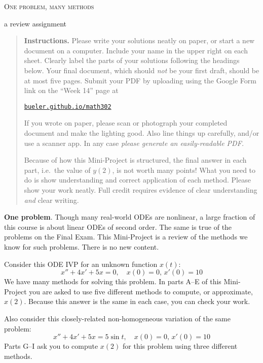 \documentclass[12pt]{article}
\theoremstyle{definition}
\begin{document}
\renewcommand{\d}{\displaystyle}

\strut
\centerline{{\Large \textsc{One problem, many methods}}}

\medskip
\centerline{{\large a review assignment}}

\medskip
\small
\renewcommand{\baselinestretch}{1.0}
\begin{quote}
\textbf{Instructions.}  Please write your solutions neatly on paper, or start a new document on a computer.  Include your name in the upper right on each sheet.  Clearly label the parts of your solutions following the headings below.    Your final document, which should \emph{not} be your first draft, should be at most five pages.  Submit your PDF by uploading using the Google Form link on the ``Week 14'' page at

     \centerline{\href{https://bueler.github.io/math302/index.html}{\texttt{bueler.github.io/math302}}}  

If you wrote on paper, please scan or photograph your completed document and make the lighting good.  Also line things up carefully, and/or use a scanner app.  In any case \emph{please generate an easily-readable PDF.}

Because of how this Mini-Project is structured, the final answer in each part, i.e.~the value of $y(2)$, is not worth many points!  What you need to do is show understanding and correct application of each method.  Please show your work neatly.  Full credit requires evidence of clear understanding \emph{and} clear writing.
\end{quote}

\normalsize
\bigskip
\renewcommand{\baselinestretch}{1.1}

\textbf{One problem}.  Though many real-world ODEs are nonlinear, a large fraction of this course is about linear ODEs of second order.  The same is true of the problems on the Final Exam.  This Mini-Project is a review of the methods we know for such problems.  There is no new content.

Consider this ODE IVP for an unknown function $x(t)$:
\begin{equation}
x''+4x'+5x=0, \quad x(0)=0, \, x'(0)=10 \label{homo}
\end{equation}
We have many methods for solving this problem.  In parts A--E of this Mini-Project you are asked to use five different methods to compute, or approximate, $x(2)$.  Because this answer is the same in each case, you can check your work.

Also consider this closely-related non-homogeneous variation of the same problem:
\begin{equation}
x''+4x'+5x=5\sin t, \quad x(0)=0, \, x'(0)=10 \label{nonhomo}
\end{equation}
Parts G--I ask you to compute $x(2)$ for this problem using three different methods.
\end{document}
